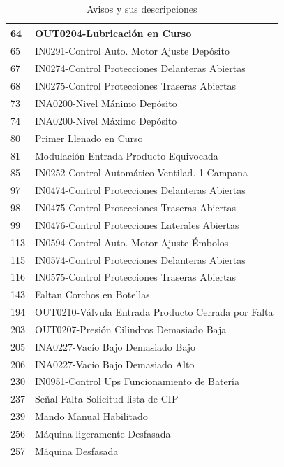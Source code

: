 \documentclass[10pt]{article}
\begin{document}
\begin{table}[!ht]
\begin{tabular}{|l|l|}
        64 & OUT0204-Lubricación en Curso \\ \hline
        65 & IN0291-Control Auto. Motor Ajuste Depósito \\ \hline
        67 & IN0274-Control Protecciones Delanteras Abiertas \\ \hline
        68 & IN0275-Control Protecciones Traseras Abiertas \\ \hline
        73 & INA0200-Nivel Má­nimo Depósito \\ \hline
        74 & INA0200-Nivel Máximo Depósito \\ \hline
        80 & Primer Llenado en Curso \\ \hline
        81 & Modulación Entrada Producto Equivocada \\ \hline
        85 & IN0252-Control Automático Ventilad. 1 Campana \\ \hline
        97 & IN0474-Control Protecciones Delanteras Abiertas \\ \hline
        98 & IN0475-Control Protecciones Traseras Abiertas \\ \hline
        99 & IN0476-Control Protecciones Laterales Abiertas \\ \hline
        113 & IN0594-Control Auto. Motor Ajuste Émbolos \\ \hline
        115 & IN0574-Control Protecciones Delanteras Abiertas \\ \hline
        116 & IN0575-Control Protecciones Traseras Abiertas \\ \hline
        143 & Faltan Corchos en Botellas \\ \hline
        194 & OUT0210-Válvula Entrada Producto Cerrada por Falta \\ \hline
        203 & OUT0207-Presión Cilindros Demasiado Baja \\ \hline
        205 & INA0227-Vacío Bajo Demasiado Bajo \\ \hline
        206 & INA0227-Vacío Bajo Demasiado Alto \\ \hline
        230 & IN0951-Control Ups Funcionamiento de Batería \\ \hline
        237 & Señal Falta Solicitud lista de CIP \\ \hline
        239 & Mando Manual Habilitado \\ \hline
        256 & Máquina ligeramente Desfasada \\ \hline
        257 & Máquina Desfasada \\ \hline
    \end{tabular}
     \caption{Avisos y sus descripciones}
\end{table}
\end{document}
